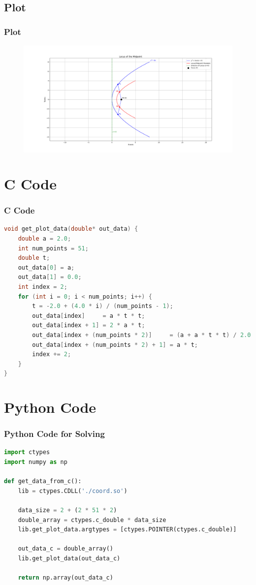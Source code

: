 \documentclass{beamer}
\theoremstyle{remark}
\numberwithin{equation}{section}
\begin{document}
\subsection{Plot}
\begin{frame}[fragile]
\frametitle{Plot}

\begin{figure}[h!]
   \centering
   \includegraphics[width=1\columnwidth]{figs/fig1.png}
	\caption{}
   \label{}
\end{figure}
\end{frame}

\section{C Code}
\begin{frame}[fragile]
\frametitle{C Code}
\begin{lstlisting}[language=C]
void get_plot_data(double* out_data) {
    double a = 2.0;
    int num_points = 51;
    double t;
    out_data[0] = a;
    out_data[1] = 0.0;
    int index = 2;
    for (int i = 0; i < num_points; i++) {
        t = -2.0 + (4.0 * i) / (num_points - 1);
        out_data[index]     = a * t * t;
        out_data[index + 1] = 2 * a * t;
        out_data[index + (num_points * 2)]     = (a + a * t * t) / 2.0;
        out_data[index + (num_points * 2) + 1] = a * t;
        index += 2;
    }
}

    \end{lstlisting}
\end{frame}

\section{Python Code}
\begin{frame}[fragile]
\frametitle{Python Code for Solving}
\begin{lstlisting}[language=Python]
import ctypes
import numpy as np

def get_data_from_c():
    lib = ctypes.CDLL('./coord.so')

    data_size = 2 + (2 * 51 * 2)
    double_array = ctypes.c_double * data_size
    lib.get_plot_data.argtypes = [ctypes.POINTER(ctypes.c_double)]

    out_data_c = double_array()
    lib.get_plot_data(out_data_c)

    return np.array(out_data_c)

\end{lstlisting}
\end{frame}
 
\end{document}
